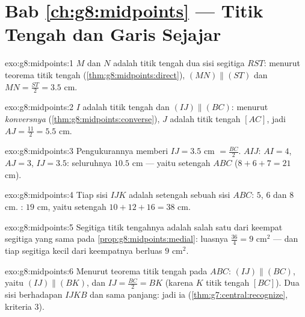 \section*{Bab \ref{ch:g8:midpoints} --- Titik Tengah dan Garis Sejajar}

\begin{solution}{exo:g8:midpoints:1}
$M$ dan $N$ adalah titik tengah dua sisi segitiga $RST$: menurut
teorema titik tengah (\cref{thm:g8:midpoints:direct}),
$(MN) \parallel (ST)$ dan $MN = \frac{ST}{2} = 3.5$ cm.
\end{solution}

\begin{solution}{exo:g8:midpoints:2}
$I$ adalah titik tengah dan $(IJ) \parallel (BC)$: menurut
\emph{konversnya} (\cref{thm:g8:midpoints:converse}), $J$ adalah titik
tengah $[AC]$, jadi $AJ = \frac{11}{2} = 5.5$ cm.
\end{solution}

\begin{solution}{exo:g8:midpoints:3}
Pengukurannya memberi $IJ = 3.5$ cm $= \frac{BC}{2}$. 
$AIJ$: $AI = 4$, $AJ = 3$, $IJ = 3.5$: seluruhnya $10.5$ cm --- yaitu
setengah  $ABC$ ($8 + 6 + 7 = 21$ cm).
\end{solution}

\begin{solution}{exo:g8:midpoints:4}
Tiap sisi $IJK$ adalah setengah sebuah sisi $ABC$: $5$, $6$ dan $8$
cm. : $19$ cm, yaitu setengah $10 + 12 + 16 = 38$ cm.
\end{solution}

\begin{solution}{exo:g8:midpoints:5}
Segitiga titik tengahnya adalah salah satu dari keempat segitiga yang
sama pada \cref{prop:g8:midpoints:medial}: luasnya
$\frac{36}{4} = 9$ cm$^2$ --- dan tiap segitiga kecil dari keempatnya
berluas $9$ cm$^2$.
\end{solution}

\begin{solution}{exo:g8:midpoints:6}
Menurut teorema titik tengah pada $ABC$: $(IJ) \parallel (BC)$, yaitu
$(IJ) \parallel (BK)$, dan $IJ = \frac{BC}{2} = BK$ (karena $K$ titik
tengah $[BC]$). Dua sisi berhadapan $IJKB$  dan sama panjang:
jadi ia 
(\cref{thm:g7:central:recognize}, kriteria 3).
\end{solution}

